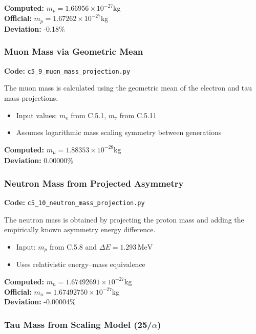 \documentclass[10.5pt,a4paper]{article}
\begin{document}
\textbf{Computed:} \( m_p = 1.66956 \times 10^{-27} \)kg \\
\textbf{Official:} \( m_p = 1.67262 \times 10^{-27} \)kg \\
\textbf{Deviation:} -0.18\%

\subsubsection{Muon Mass via Geometric Mean}

\textbf{Code:} \texttt{c5\_9\_muon\_mass\_projection.py}

The muon mass is calculated using the geometric mean of the electron and tau mass projections.

\begin{itemize}
    \item Input values: \( m_e \) from C.5.1, \( m_\tau \) from C.5.11
    \item Assumes logarithmic mass scaling symmetry between generations
\end{itemize}

\textbf{Computed:} \( m_\mu = 1.88353 \times 10^{-28} \)kg \\
\textbf{Deviation:} 0.00000\%

\subsubsection{Neutron Mass from Projected Asymmetry}

\textbf{Code:} \texttt{c5\_10\_neutron\_mass\_projection.py}

The neutron mass is obtained by projecting the proton mass and adding the empirically known asymmetry energy difference.

\begin{itemize}
    \item Input: \( m_p \) from C.5.8 and \(\Delta E = 1.293\,\mathrm{MeV}\)
    \item Uses relativistic energy–mass equivalence
\end{itemize}

\textbf{Computed:} \( m_n = 1.67492691 \times 10^{-27} \)kg \\
\textbf{Official:} \( m_n = 1.67492750 \times 10^{-27} \)kg \\
\textbf{Deviation:} -0.00004\%

\subsubsection{Tau Mass from Scaling Model (25/\(\alpha\))}
\end{document}
